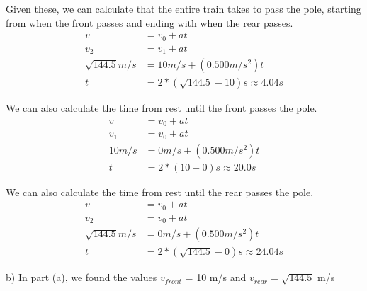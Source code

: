 \documentclass[12pt]{article}
\begin{document}
Given these, we can calculate that the entire train takes to pass the pole, starting from when the front passes and ending with when the rear passes.
\begin{align*}
    v &= v_0 + at\\
    v_2 &= v_1 + at\\
    \sqrt{144.5} \unit{m/s} &= 10 \unit{m/s} + (0.500\unit{m/s^2})t\\
    t &= 2*(\sqrt{144.5} - 10) \unit{s} \approx \boxed{4.04 \unit{s}}
\end{align*}

We can also calculate the time from rest until the front passes the pole.
\begin{align*}
    v &= v_0 + at\\
    v_1 &= v_0 + at\\
    10 \unit{m/s} &= 0 \unit{m/s} + (0.500\unit{m/s^2})t\\
    t &= 2*(10 - 0) \unit{s} \approx \boxed{20.0 \unit{s}}
\end{align*}

We can also calculate the time from rest until the rear passes the pole.
\begin{align*}
    v &= v_0 + at\\
    v_2 &= v_0 + at\\
    \sqrt{144.5} \unit{m/s} &= 0 \unit{m/s} + (0.500\unit{m/s^2})t\\
    t &= 2*(\sqrt{144.5} - 0) \unit{s} \approx \boxed{24.04 \unit{s}}
\end{align*}

b) In part (a), we found the values $v_{front}$ = 10 m/s and $v_{rear} = \sqrt{144.5}$ m/s
\end{document}
